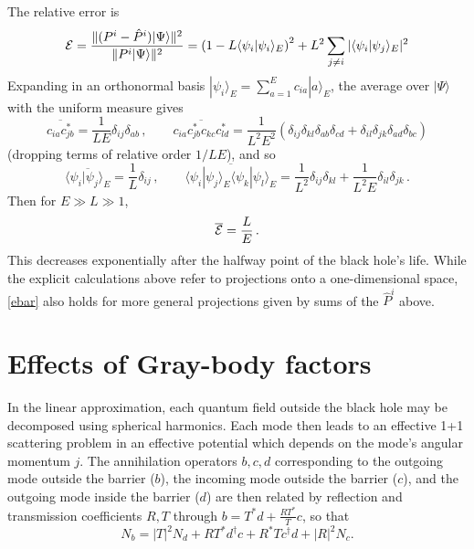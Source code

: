 \documentclass[12pt]{article}
\newcommand{\sect}[1]{\section{#1}\setcounter{equation}{0}}
\begin{document}
The relative error is
\begin{equation}
{\cal E} = \frac{ \| ( P^i -  \hat P^i) |\Psi\rangle \|^2}{ \| P^i |\Psi\rangle \|^2 } = \left(1 - L \langle  \psi_i |  \psi_i \rangle_E \right)^2
+ L^2 \sum_{ j \neq i} |\langle  \psi_i |  \psi_j \rangle_E|^2
\end{equation}
Expanding in an orthonormal basis $|\psi_i \rangle_E = \sum_{a=1}^E c_{ia} | a\rangle_E$, the average over
$|\Psi\rangle$ with the uniform measure gives
\begin{equation}
\overline{  c_{ia}  c^*_{jb} } = \frac{1}{LE}{\delta_{ij} \delta_{ab}}  \,, \qquad \overline{  c_{ia}  c^*_{jb} c_{kc} c^*_{ld} } =
\frac{1}{L^2 E^2} (\delta_{ij} \delta_{kl} \delta_{ab} \delta_{cd} + \delta_{il} \delta_{jk} \delta_{ad} \delta_{bc}  )
\label{uniform}
\end{equation}
(dropping terms of relative order $1/LE$), and so
\begin{equation}
\overline{  \langle  \psi_i |  \psi_j\rangle_E } = \frac{1}{L}{\delta_{ij} }  \,, \qquad \overline{   \langle  \psi_i |  \psi_j\rangle_E   \langle  \psi_k |  \psi_l\rangle_E  } =
\frac{1}{L^2}  \delta_{ij} \delta_{kl}  + \frac{1}{L^2 E} \delta_{il} \delta_{jk}  \label{uniform2}\,.
\end{equation}
Then for $E \gg L \gg 1$,
\begin{equation}
\label{ebar}
\overline{ \cal E  } =
\frac{L}{E}  \,.
\end{equation}
This decreases exponentially after the halfway point of the black hole's life.  While the explicit calculations above refer to projections onto a one-dimensional space, \eqref{ebar} also holds for more general projections given by sums of the $\hat P^i$ above.

\sect{Effects of Gray-body factors}
\label{gray}

In the linear approximation, each quantum field outside the black hole may be decomposed using spherical harmonics.  Each mode then leads to an effective 1+1 scattering problem in an effective potential which depends on the mode's angular momentum $j$.  The annihilation operators $b,c,d$ corresponding to the outgoing mode outside the barrier ($b$), the incoming mode outside the barrier ($c$), and the outgoing mode inside the barrier ($d$) are then related by reflection and transmission coefficients $R,T$ through $b = T^*d + \frac{RT^*}{T}c$, so that
\begin{equation}
N_b = |T|^2 N_d + RT^* d^\dagger c + R^* T c^\dagger d + |R|^2 N_c.
\end{equation}
\end{document}
